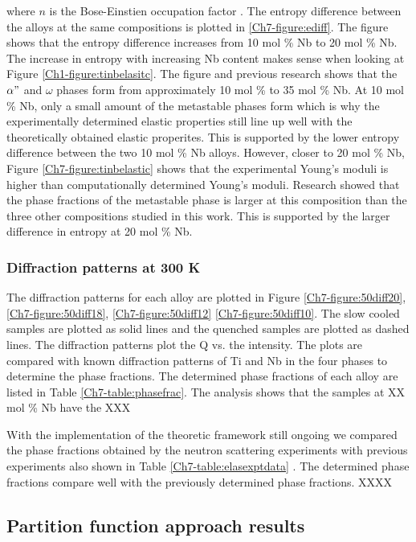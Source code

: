 \noindent where $n$ is the Bose-Einstien occupation factor \cite{Budai2014}. The entropy difference between the alloys at the same compositions is plotted in \ref{Ch7-figure:ediff}. The figure shows that the entropy difference increases from 10 mol \% Nb to 20 mol \% Nb. The increase in entropy with increasing Nb content makes sense when looking at Figure \ref{Ch1-figure:tinbelasitc}. The figure and previous research shows that the $\alpha"$ and $\omega$ phases form from approximately 10 mol \% to 35 mol \% Nb. At 10 mol \% Nb, only a small amount of the metastable phases form which is why the experimentally determined elastic properties still line up well with the theoretically obtained elastic properites. This is supported by the lower entropy difference between the two 10 mol \% Nb alloys. However, closer to 20 mol \% Nb, Figure \ref{Ch7-figure:tinbelastic} shows that the experimental Young's moduli is higher than computationally determined Young's moduli. Research showed that the phase fractions of the metastable phase is larger at this composition than the three other compositions studied in this work. This is supported by the larger difference in entropy at 20 mol \% Nb.

\subsubsection{Diffraction patterns at 300 K}

The diffraction patterns for each alloy are plotted in Figure \ref{Ch7-figure:50diff20}, \ref{Ch7-figure:50diff18}, \ref{Ch7-figure:50diff12} \ref{Ch7-figure:50diff10}. The slow cooled samples are plotted as solid lines and the quenched samples are plotted as dashed lines. The diffraction patterns plot the Q vs. the intensity. The plots are compared with known diffraction patterns of Ti and Nb in the four phases to determine the phase fractions. The determined phase fractions of each alloy are listed in Table \ref{Ch7-table:phasefrac}. The analysis shows that the samples at XX mol \% Nb have the XXX 

With the implementation of the theoretic framework still ongoing we compared the phase fractions obtained by the neutron scattering experiments with previous experiments also shown in Table \ref{Ch7-table:elasexptdata} \cite{Ozaki2004,Timoshevskii2011,Friak2012,Karre2015}. The determined phase fractions compare well with the previously determined phase fractions. XXXX

\subsection{Partition function approach results}

